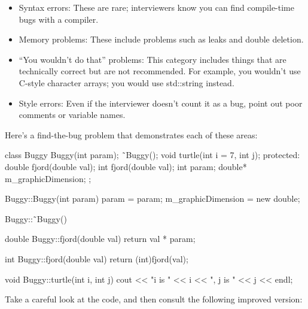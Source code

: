 \begin{itemize}
\item
Syntax errors: These are rare; interviewers know you can find compile-time bugs with a compiler.

\item
Memory problems: These include problems such as leaks and double deletion.

\item
“You wouldn’t do that” problems: This category includes things that are technically correct but are not recommended. For example, you wouldn’t use C-style character arrays; you would use std::string instead.

\item
Style errors: Even if the interviewer doesn’t count it as a bug, point out poor comments or variable names.
\end{itemize}

Here’s a find-the-bug problem that demonstrates each of these areas:

\begin{cpp}
class Buggy
{
    Buggy(int param);
    ˜Buggy();
    void turtle(int i = 7, int j);
    protected:
    double fjord(double val);
    int fjord(double val);
    int param;
    double* m_graphicDimension;
};

Buggy::Buggy(int param)
{
    param = param;
    m_graphicDimension = new double;
}

Buggy::˜Buggy()
{}

double Buggy::fjord(double val)
{
    return val * param;
}

int Buggy::fjord(double val)
{
    return (int)fjord(val);
}

void Buggy::turtle(int i, int j)
{
    cout << "i is " << i << ", j is " << j << endl;
}
\end{cpp}

Take a careful look at the code, and then consult the following improved version:

